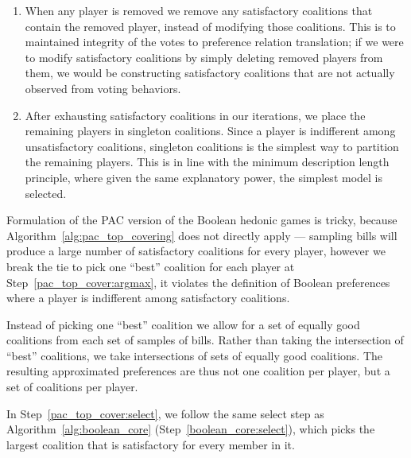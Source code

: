 \begin{enumerate}
  \item When any player is removed we remove any satisfactory coalitions that
    contain the removed player, instead of modifying those coalitions.
    This is to maintained integrity of the votes to preference relation
    translation; if we were to modify satisfactory coalitions by simply
    deleting removed players from them, we would be constructing satisfactory
    coalitions that are not actually observed from voting behaviors.
  \item After exhausting satisfactory coalitions in our iterations, we place
    the remaining players in singleton coalitions.
    Since a player is indifferent among unsatisfactory coalitions, singleton
    coalitions is the simplest way to partition the remaining players.
    This is in line with the minimum description length principle, where given
    the same explanatory power, the simplest model is selected.
\end{enumerate}

Formulation of the PAC version of the Boolean hedonic games is tricky, because
Algorithm~\ref{alg:pac_top_covering} does not directly apply --- sampling bills
will produce a large number of satisfactory coalitions for every player, however
we break the tie to pick one ``best'' coalition for each player at
Step~\ref{pac_top_cover:argmax}, it violates the definition of Boolean
preferences where a player is indifferent among satisfactory coalitions.

Instead of picking one ``best'' coalition we allow for a set of equally good
coalitions from each set of samples of bills.
Rather than taking the intersection of ``best'' coalitions, we take intersections
of sets of equally good coalitions.
The resulting approximated preferences are thus not one coalition per player,
but a set of coalitions per player.

In Step~\ref{pac_top_cover:select}, we follow the same select step as
Algorithm~\ref{alg:boolean_core} (Step~\ref{boolean_core:select}), which picks
the largest coalition that is satisfactory for every member in it.

